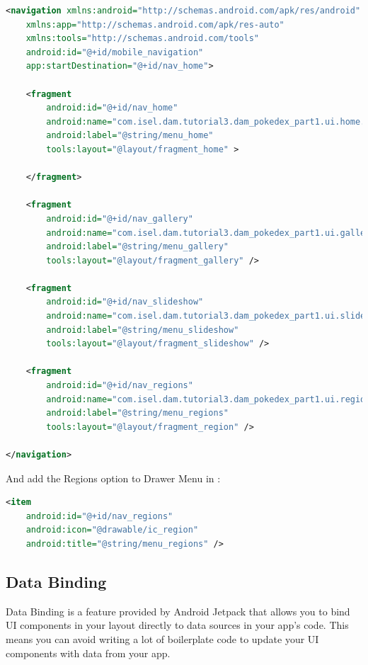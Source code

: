 \documentclass[a4paper, 12pt]{article}
\begin{document}
\begin{lstlisting}[caption={Navigation with Region Fragment.}, label={code:nav_region_code}, language=XML]
	<navigation xmlns:android="http://schemas.android.com/apk/res/android"
    xmlns:app="http://schemas.android.com/apk/res-auto"
    xmlns:tools="http://schemas.android.com/tools"
    android:id="@+id/mobile_navigation"
    app:startDestination="@+id/nav_home">

    <fragment
        android:id="@+id/nav_home"
        android:name="com.isel.dam.tutorial3.dam_pokedex_part1.ui.home.HomeFragment"
        android:label="@string/menu_home"
        tools:layout="@layout/fragment_home" >

    </fragment>

    <fragment
        android:id="@+id/nav_gallery"
        android:name="com.isel.dam.tutorial3.dam_pokedex_part1.ui.gallery.GalleryFragment"
        android:label="@string/menu_gallery"
        tools:layout="@layout/fragment_gallery" />

    <fragment
        android:id="@+id/nav_slideshow"
        android:name="com.isel.dam.tutorial3.dam_pokedex_part1.ui.slideshow.SlideshowFragment"
        android:label="@string/menu_slideshow"
        tools:layout="@layout/fragment_slideshow" />

    <fragment
        android:id="@+id/nav_regions"
        android:name="com.isel.dam.tutorial3.dam_pokedex_part1.ui.region.RegionFragment"
        android:label="@string/menu_regions"
        tools:layout="@layout/fragment_region" />
   
</navigation>
\end{lstlisting}

And add the Regions option to Drawer Menu in \textit{\texttt{}}:

\begin{lstlisting}[caption={Navigation with Region Fragment.}, label={code:nav_region_code}, language=XML]
    <item
    android:id="@+id/nav_regions"
    android:icon="@drawable/ic_region"
    android:title="@string/menu_regions" />
\end{lstlisting}

\subsection{Data Binding}

Data Binding is a feature provided by Android Jetpack that allows you to bind UI components in your layout directly to data sources in your app's code.
 This means you can avoid writing a lot of boilerplate code to update your UI components with data from your app.
\end{document}

